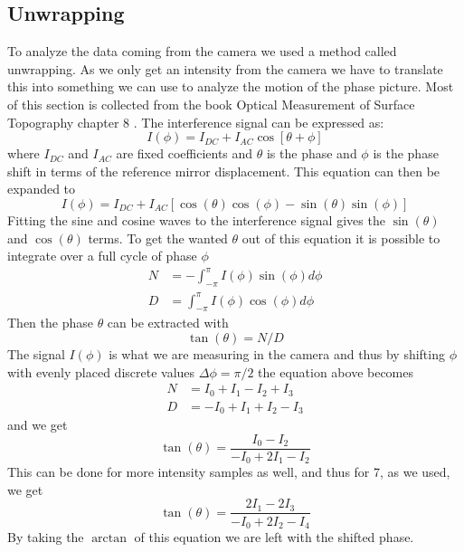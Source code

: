 \subsection {Unwrapping}
To analyze the data coming from the camera we used a method called unwrapping.
As we only get an intensity from the camera we have to translate this into something
we can use to analyze the motion of the phase picture. Most of this section
is collected from the book Optical Measurement of Surface Topography chapter 8
\cite{omst}.
The interference signal can be expressed as:
\begin {equation}
I(\phi) = I_{DC} + I_{AC}\cos[\theta + \phi]
\end {equation}
where $I_{DC}$ and $I_{AC}$ are fixed coefficients and $\theta$ is the phase and
$\phi$ is the phase shift in terms of the reference mirror displacement.
This equation can then be expanded to
\begin {equation}
I(\phi) = I_{DC} + I_{AC}[\cos(\theta)\cos(\phi) - \sin(\theta)\sin(\phi)]
\end {equation}
Fitting the sine and cosine waves to the interference signal gives the $\sin(\theta)$
and $\cos(\theta)$ terms.
To get the wanted $\theta$ out of this equation it is possible to integrate over
a full cycle of phase $\phi$
\begin {align}
N &= -\int_{-\pi}^{\pi}I(\phi)\sin(\phi)d\phi\\
D &= \int_{-\pi}^{\pi}I(\phi)\cos(\phi)d\phi
\end {align}
Then the phase $\theta$ can be extracted with
\begin {equation}
\tan(\theta) = N/D
\end {equation}
The signal $I(\phi)$ is what we are measuring in the camera and thus by shifting
$\phi$ with evenly placed discrete values $\Delta\phi = \pi/2$ the equation above
becomes
\begin {align}
N &= I_0 +I_1 - I_2 + I_3\\
D &= -I_0 + I_1 + I_2 - I_3
\end {align}
and we get 
\begin {equation}
\tan(\theta) = \frac{I_0 - I_2}{-I_0 + 2I_1 - I_2}
\end {equation}
This can be done for more intensity samples as well, and thus for 7, as we used,
we get
\begin {equation}
\tan(\theta) = \frac{2I_1 - 2I_3}{-I_0 + 2I_2 - I_4}
\end {equation}
By taking the $\arctan$ of this equation we are left with the shifted phase.
